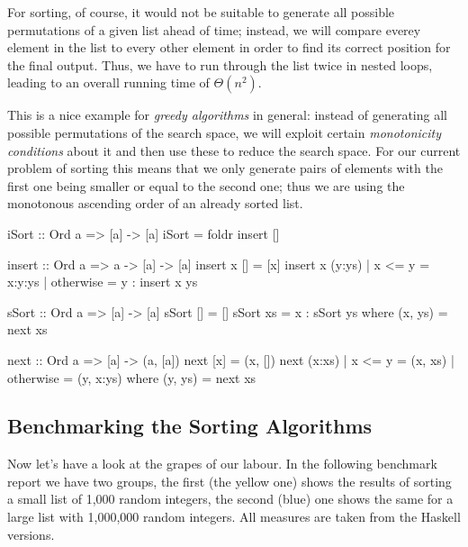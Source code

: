 For sorting, of course, it would not be suitable to generate all possible permutations of a given list ahead of time; instead, we will compare everey element in the list to every other element in order to find its correct position for the final output.
Thus, we have to run through the list twice in nested loops, leading to an overall running time of $\Theta (n^2)$.

This is a nice example for \emph{greedy algorithms} in general: instead of generating all possible permutations of the search space, we will exploit certain \emph{monotonicity conditions} about it and then use these to reduce the search space.
For our current problem of sorting this means that we only generate pairs of elements with the first one being smaller or equal to the second one; thus we are using the monotonous ascending order of an already sorted list.

\begin{impl}
\end{impl}

\begin{haskellcode}
iSort :: Ord a => [a] -> [a]
iSort = foldr insert []

insert :: Ord a => a -> [a] -> [a]
insert x [] = [x]
insert x (y:ys) | x <= y = x:y:ys
                | otherwise = y : insert x ys
\end{haskellcode}

\begin{impl}
\end{impl}

\begin{haskellcode}
sSort :: Ord a => [a] -> [a]
sSort [] = []
sSort xs = x : sSort ys where (x, ys) = next xs

next :: Ord a => [a] -> (a, [a])
next [x] = (x, [])
next (x:xs) | x <= y = (x, xs)
            | otherwise = (y, x:ys)
            where (y, ys) = next xs
\end{haskellcode}

\subsection{Benchmarking the Sorting Algorithms}

Now let's have a look at the grapes of our labour.
In the following benchmark report we have two groups, the first (the yellow one) shows the results of sorting a small list of 1,000 random integers, the second (blue) one shows the same for a large list with 1,000,000 random integers. All measures are taken from the Haskell versions.

